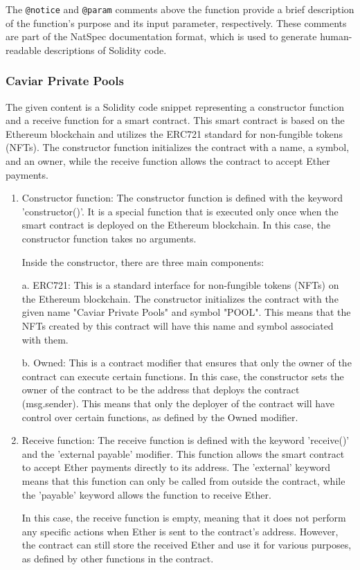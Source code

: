The \texttt{@notice} and \texttt{@param} comments above the function
provide a brief description of the function's purpose and its input
parameter, respectively. These comments are part of the NatSpec
documentation format, which is used to generate human-readable
descriptions of Solidity code.

\hypertarget{caviar-private-pools}{%
\subsubsection{Caviar Private Pools}\label{caviar-private-pools}}

The given content is a Solidity code snippet representing a constructor
function and a receive function for a smart contract. This smart
contract is based on the Ethereum blockchain and utilizes the ERC721
standard for non-fungible tokens (NFTs). The constructor function
initializes the contract with a name, a symbol, and an owner, while the
receive function allows the contract to accept Ether payments.

\begin{enumerate}
\def\labelenumi{\arabic{enumi}.}
\item
  Constructor function: The constructor function is defined with the
  keyword 'constructor()'. It is a special function that is executed
  only once when the smart contract is deployed on the Ethereum
  blockchain. In this case, the constructor function takes no arguments.

  Inside the constructor, there are three main components:

  a. ERC721: This is a standard interface for non-fungible tokens (NFTs)
  on the Ethereum blockchain. The constructor initializes the contract
  with the given name "Caviar Private Pools" and symbol "POOL". This
  means that the NFTs created by this contract will have this name and
  symbol associated with them.

  b. Owned: This is a contract modifier that ensures that only the owner
  of the contract can execute certain functions. In this case, the
  constructor sets the owner of the contract to be the address that
  deploys the contract (msg.sender). This means that only the deployer
  of the contract will have control over certain functions, as defined
  by the Owned modifier.
\item
  Receive function: The receive function is defined with the keyword
  'receive()' and the 'external payable' modifier. This function allows
  the smart contract to accept Ether payments directly to its address.
  The 'external' keyword means that this function can only be called
  from outside the contract, while the 'payable' keyword allows the
  function to receive Ether.

  In this case, the receive function is empty, meaning that it does not
  perform any specific actions when Ether is sent to the contract's
  address. However, the contract can still store the received Ether and
  use it for various purposes, as defined by other functions in the
  contract.
\end{enumerate}

